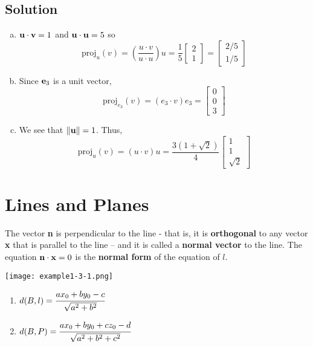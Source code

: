 \subsection*{Solution}
\begin{enumerate}[(a)]
    \item $\mathbf{u\cdot v}=1$ and $\mathbf{u\cdot u}=5$ so
          $$\text{proj}_u(v)=\left(\frac{u\cdot v}{u\cdot u}\right)u=\frac{1}{5}\begin{bmatrix}
                  2 \\ 1
              \end{bmatrix}=\begin{bmatrix}
                  2/5 \\ 1/5
              \end{bmatrix}$$
    \item Since $\mathbf{e}_3$ is a unit vector,
          $$\text{proj}_{e_3}(v)=(e_3\cdot v)e_3=\begin{bmatrix}
                  0 \\ 0 \\ 3
              \end{bmatrix}$$
    \item We see that $\Vert\mathbf{u}\Vert=1$. Thus,
          $$\text{proj}_u(v)=(u\cdot v)u=\frac{3(1+\sqrt{2})}{4}\begin{bmatrix}
                  1 \\ 1 \\ \sqrt{2}
              \end{bmatrix}$$
\end{enumerate}

\section{Lines and Planes}
The vector \textbf{n} is perpendicular to the line - that is, it is
\textbf{orthogonal} to any vector \textbf{x} that is parallel to the line – and it
is called a \textbf{normal vector} to the line. The equation $\mathbf{n\cdot x} = 0$ is
the \textbf{normal form} of the equation of $l$.
\begin{center}
    \texttt{[image: example1-3-1.png]}
\end{center}
\begin{enumerate}
    \item[] $d(B,l)=\cfrac{ax_0+by_0-c}{\sqrt{a^2+b^2}}$
    \item[] $d(B,P)=\cfrac{ax_0+by_0+cz_0-d}{\sqrt{a^2+b^2+c^2}}$
\end{enumerate}

